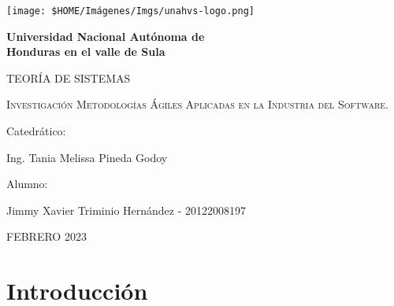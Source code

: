 \documentclass[12pt]{article}
\begin{document}
\begin{titlepage}

  \begin{center}
    {\texttt{[image: \$HOME/Imágenes/Imgs/unahvs-logo.png]}\par}
  
    {\bfseries\Huge Universidad Nacional Autónoma de\\
                     Honduras en el valle de Sula \par}
  
    \vspace{1cm}
  
    {\scshape\huge TEORÍA DE SISTEMAS\par}
  
    \vspace{1cm}
  
    {\scshape\Large 
      Investigación Metodologías Ágiles Aplicadas en la Industria del Software.
    }
  
    \vfill 
    {\large Catedrático:\par} %
    {\large Ing. Tania Melissa Pineda Godoy\par} %
  
    \vfill
    {\large Alumno: \par}
    {\large Jimmy Xavier Triminio Hernández - 20122008197 \par}

    \vfill
    {\large FEBRERO 2023\par} %

  \end{center}

\end{titlepage}

\newpage
\tableofcontents

\newpage
\section{ Introducción }
\end{document}

